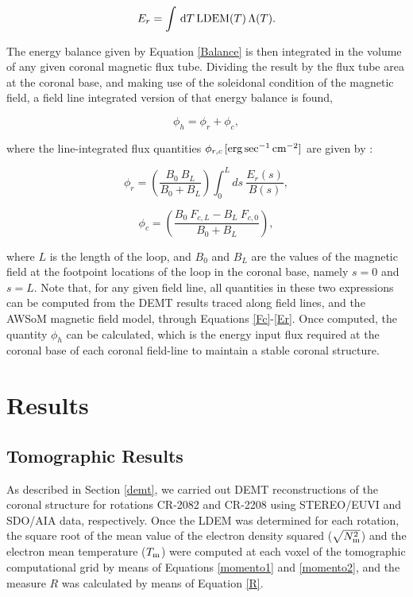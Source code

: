 \documentclass[namedreferences]{solarphysics}
\newcommand{\LDEM}{{\rm LDEM}}
\newcommand{\Tm}{T_{\rm m}}
\newcommand{\Nsqm}{N^2_{{\rm m}}}
\newcommand{\sqravgN}{\sqrt{\Nsqm}}
\begin{document}
\begin{article}
\begin{equation}\label{Er}
E_r = \int\,\textrm{d}T\,\LDEM(T)\,\Lambda(T).
\end{equation}

{The energy balance given by Equation \ref{Balance} is then integrated in the volume of any given coronal magnetic flux tube. Dividing the result by the flux tube area at the coronal base, and making use of the soleidonal condition of the magnetic field, a {field line integrated} version of that energy balance is found,

\begin{equation}\label{FluxBalance}
\phi_h = \phi_r + \phi_c,
\end{equation}

\noindent
where the {line-integrated} flux quantities $\phi_{r,c}\,[\rm{erg\,sec^{-1}\,cm^{-2}}]$ are given by \citep{maccormack_2017}:}

\begin{equation}\label{phi_r}
\phi_r = \left( \frac{B_0 \ B_L}{B_0 + B_L} \right) \int_{0}^{L} ds \ \frac{E_r(s)}{B(s)},
\end{equation}

\begin{equation}\label{phi_c}
\phi_c = \left( \frac{B_0 \ F_{c,L} - B_L \ F_{c,0}}{B_0 + B_L} \right) ,
\end{equation}

\noindent 
{where $L$ is the length of the loop, and $B_0$ and $B_L$ are the values of the magnetic field at the footpoint locations of the loop in the coronal base, namely $s=0$ and $s=L$.} {Note that, for any given field line, all quantities in these two expressions can be computed {from the DEMT results traced along field lines, and the AWSoM magnetic field model,} through Equations \ref{Fc}-\ref{Er}. Once computed, the quantity $\phi_h$ can be calculated, which is the energy input flux required at the coronal base of each coronal field-line to maintain a stable coronal structure.}

\section{Results}\label{resu} 

\subsection{Tomographic Results}\label{demt_res} 

{As described in Section \ref{demt}, we carried out DEMT reconstructions of the coronal structure for rotations CR-2082 and CR-2208 using STEREO/EUVI and SDO/AIA data, respectively.} {Once the LDEM was determined for each rotation, the square root of the mean value of the electron density squared ($\sqravgN$) and the electron mean temperature ($\Tm$) were computed at each voxel of the tomographic computational grid by means of Equations \ref{momento1} and \ref{momento2}{, and the measure $R$ was calculated by means of Equation \ref{R}.}} 


\end{article}
\end{document}
